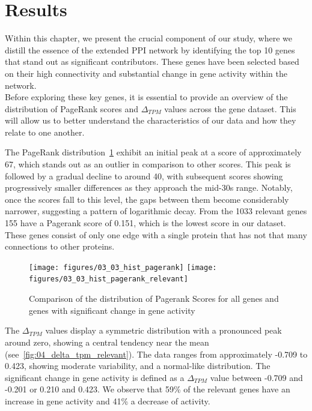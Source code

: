 \section{Results} \label{sec:results}

Within this chapter, we present the crucial component of our study,
where we distill the essence of the extended PPI network by identifying the top 10 genes that stand out as significant contributors.
These genes have been selected based on their high connectivity and substantial change in gene activity within the network.\\

Before exploring these key genes,
it is essential to provide an overview of the distribution of PageRank scores and $\Delta_{TPM}$ values across the gene dataset.
This will allow us to better understand the characteristics of our data and how they relate to one another.

The PageRank distribution~\cref{fig:03_02_hist_pagerank} exhibit an initial peak at a score of approximately 67,
which stands out as an outlier in comparison to other scores.
This peak is followed by a gradual decline to around 40, with subsequent scores showing progressively smaller differences
as they approach the mid-30s range.
Notably, once the scores fall to this level, the gaps between them become considerably narrower,
suggesting a pattern of logarithmic decay.
From the 1033 relevant genes 155 have a Pagerank score of 0.151, which is the lowest score in our dataset.
These genes consist of only one edge with a single protein that has not that many connections to other proteins.\\


\begin{figure}[h]
        \texttt{[image: figures/03\_03\_hist\_pagerank]}
    \endminipage
    \hfill
      \texttt{[image: figures/03\_03\_hist\_pagerank\_relevant]}
    \endminipage
    \caption{Comparison of the distribution of Pagerank Scores for all genes and genes with significant change in gene activity}
    \label{fig:03_02_hist_pagerank}
\end{figure}

The $\Delta_{TPM}$ values display a symmetric distribution with a pronounced peak around zero, showing a central tendency near the mean
(see~\cref{fig:04_delta_tpm_relevant}).
The data ranges from approximately -0.709 to 0.423, showing moderate variability, and a normal-like distribution.
The significant change in gene activity is defined as a $\Delta_{TPM}$ value between -0.709 and -0.201 or 0.210 and 0.423.
We observe that  59\% of the relevant genes have an increase in gene activity and 41\% a decrease of activity.\\

